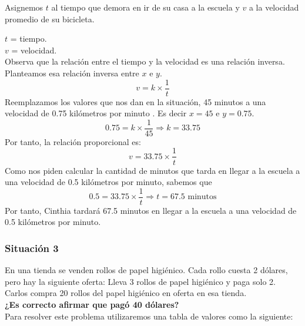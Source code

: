 \documentclass[11pt]{book}
\begin{document}
Asignemos $t$ al tiempo que demora en ir de su casa a la escuela y $v$ a la velocidad promedio de su bicicleta.

$t$ = tiempo.\\
$v$ = velocidad.\\

Observa que la relación entre el tiempo y la velocidad es una relación inversa. Planteamos esa relación inversa entre $x$ e $y$.
\[v=k \times \frac{1}{t}\]
Reemplazamos los valores que nos dan en la situación, 45 minutos a una velocidad de 0.75 kilómetros por minuto . Es decir $x=45$ e $y=0.75$.
\[0.75=k\times \frac{1}{45} \Rightarrow k=33.75\]
Por tanto, la relación proporcional es:
\[v=33.75 \times \frac{1}{t}\]
Como nos piden calcular la cantidad de minutos que tarda en llegar a la escuela a una velocidad de 0.5 kilómetros por minuto, sabemos que \[0.5=33.75 \times \frac{1}{t} \Rightarrow t=67.5 \text{ minutos}\]
Por tanto, Cinthia tardará 67.5 minutos en llegar a la escuela a una velocidad de 0.5 kilómetros por minuto.

\subsubsection{Situación 3}

En una tienda se venden rollos de papel higiénico. Cada rollo cuesta 2 dólares, pero hay la siguiente oferta:
Lleva 3 rollos de papel higiénico y paga solo 2.
Carlos compra 20 rollos del papel higiénico en oferta en esa tienda.\\
\textbf{¿Es correcto afirmar que pagó 40 dólares?}\\

Para resolver este problema utilizaremos una tabla de valores como la siguiente:


\end{document}
